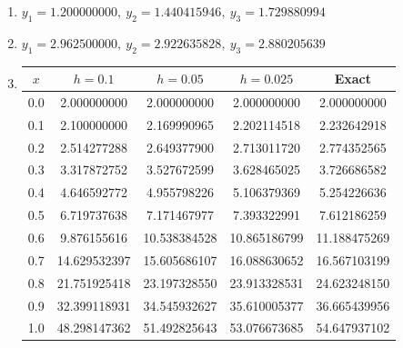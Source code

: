 \documentclass[openany]{book}
\newenvironment{sectionSolutions}{
 \begin{enumerate}[item-label={\thesection.\arabic{enumi}.}]
}{
 \end{enumerate}
}
\begin{document}
\begin{sectionSolutions}
\item
$y_1=1.200000000,\ y_2=1.440415946,\ y_3=1.729880994$

\item
$y_1=2.962500000,\ y_2=2.922635828,\ y_3=2.880205639$
\bigskip

\item
{\small
{}
\begin{tabular}{S[table-format=1.1] *4{S[table-format=2.9]} }\toprule
{$x$}&{$h=0.1$}&{$h=0.05$}&{$h=0.025$}&{Exact}\\  &  2.000000000 &   2.000000000 &  2.000000000 &   2.000000000 \\
0.1 &  2.100000000 &   2.169990965 &  2.202114518 &   2.232642918 \\
0.2 &  2.514277288 &   2.649377900 &  2.713011720 &   2.774352565 \\
0.3 &  3.317872752 &   3.527672599 &  3.628465025 &   3.726686582 \\
0.4 &  4.646592772 &   4.955798226 &  5.106379369 &   5.254226636 \\
0.5 &  6.719737638 &   7.171467977 &  7.393322991 &   7.612186259 \\
0.6 &  9.876155616 &  10.538384528 & 10.865186799 &  11.188475269 \\
0.7 & 14.629532397 &  15.605686107 & 16.088630652 &  16.567103199 \\
0.8 & 21.751925418 &  23.197328550 & 23.913328531 &  24.623248150 \\
0.9 & 32.399118931 &  34.545932627 & 35.610005377 &  36.665439956 \\
1.0 & 48.298147362 &  51.492825643 & 53.076673685 &  54.647937102 \\
\bottomrule
\end{tabular}}\bigskip


\end{sectionSolutions}
\end{document}
